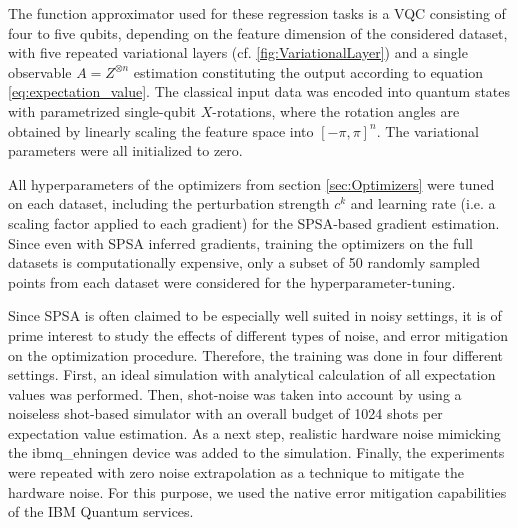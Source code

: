 The function approximator used for these regression tasks is a VQC consisting of four to five qubits, depending on the feature dimension of the considered dataset, with five repeated variational layers (cf. \cref{fig:VariationalLayer}) and a single observable \(A = Z^{\otimes n}\) estimation constituting the output according to equation \eqref{eq:expectation_value}. The classical input data was encoded into quantum states with parametrized single-qubit \(X\)-rotations, where the rotation angles are obtained by linearly scaling the feature space into \(\left[-\pi, \pi\right]^n\). The variational parameters were all initialized to zero. 

All hyperparameters of the optimizers from section \ref{sec:Optimizers} were tuned on each dataset, including the perturbation strength \(c^k\) and learning rate (i.e. a scaling factor applied to each gradient) for the SPSA-based gradient estimation. Since even with SPSA inferred gradients, training the optimizers on the full datasets is computationally expensive, only a subset of 50 randomly sampled points from each dataset were considered for the hyperparameter-tuning.

Since SPSA is often claimed to be especially well suited in noisy settings, it is of prime interest to study the effects of different types of noise, and error mitigation on the optimization procedure. Therefore, the training was done in four different settings. First, an ideal simulation with analytical calculation of all expectation values was performed. Then, shot-noise was taken into account by using a noiseless shot-based simulator with an overall budget of 1024 shots per expectation value estimation. As a next step, realistic hardware noise mimicking the ibmq\_ehningen device was added to the simulation. Finally, the experiments were repeated with zero noise extrapolation \cite{temme2017error} as a technique to mitigate the hardware noise. For this purpose, we used the native error mitigation capabilities of the IBM Quantum services.
